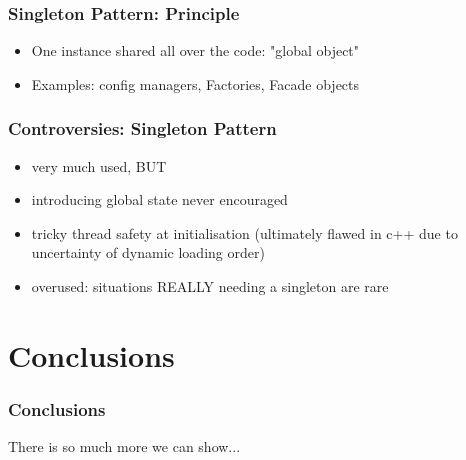 \documentclass{beamer}
\begin{document}
\begin{frame}
\frametitle{Singleton Pattern: Principle}
\begin{itemize}
 \item One instance shared all over the code: "global object"
 \item Examples: config managers, Factories, Facade objects
\end{itemize}
\end{frame} 

\begin{frame}
\frametitle{Controversies: Singleton Pattern}
\begin{itemize}
 \item very much used, BUT
 \item introducing global state never encouraged
 \item tricky thread safety at initialisation (ultimately flawed in c++ due to uncertainty of dynamic loading order)
 \item overused: situations REALLY needing a singleton are rare
\end{itemize}
\end{frame} 





\section{Conclusions}
\begin{frame}
\frametitle{Conclusions}


There is so much more we can show...
 
\end{frame}

\end{document}
